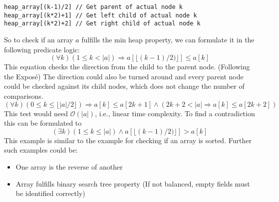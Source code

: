 \documentclass{article}
\begin{document}
\begin{lstlisting}[language=Solidity, style=Solidity, numbers=none, caption=Access a heap in array representation]
heap_array[(k-1)/2] // Get parent of actual node k
heap_array[(k*2)+1] // Get left child of actual node k
heap_array[(k*2)+2] // Get right child of actual node k
\end{lstlisting}
So to check if an array $a$ fulfills the min heap property, we can formulate it in the following predicate logic:
\begin{equation}\label{eq:heap-unversial}
  (\forall k) (1 \le k < |a|) \Rightarrow a[\lfloor(k-1)/2)\rfloor] \le a[k]
\end{equation}
This equation checks the direction from the child to the parent node. (Following the Exposé) The direction could also be turned around and every parent node could be checked against its child nodes, which does not change the number of comparisons.
\begin{equation}\label{eq:heap-unversial}
  (\forall k) (0 \le k \le \lfloor |a|/2 \rfloor) \Rightarrow a[k] \le a[2k+1] \land (2k+2 < |a| \Rightarrow a[k] \le a[2k+2])
\end{equation}
This test would need $\mathcal{O}(|a|)$, i.e., linear time complexity. To find a contradiction this can be formulated to
\begin{equation}\label{eq:heap-unversial}
  (\exists k) (1 \le k \le |a|) \land a[\lfloor(k-1)/2)\rfloor] > a[k]
\end{equation}
This example is similar to the example for checking if an array is sorted. Further such examples could be:
\begin{itemize}
    \item One array is the reverse of another
    \item Array fulfills binary search tree property (If not balanced, empty fields must be identified correctly)
\end{itemize}

\end{document}
